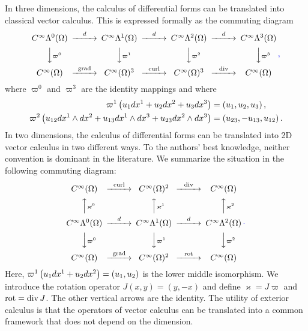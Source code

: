 \documentclass[10pt,a4paper]{article}
\newcommand\cye[1]{%
\protect\leavevmode
\begingroup
    \color{blue}%
    #1%
\endgroup
}
\begin{document}
\begin{remark}
    In three dimensions, 
    the calculus of differential forms can be translated into classical vector calculus. 
    This is expressed formally as the commuting diagram 
    \begin{gather*}
    \begin{CD}
        C^\infty\Alt^0(\Omega) @>{\cartan}>> C^\infty\Alt^1(\Omega) @>{\cartan}>> C^\infty\Alt^2(\Omega) @>{\cartan}>> C^\infty\Alt^3(\Omega) 
        \\
        @VV{\varpi^{0}}V 
        @VV{\varpi^{1}}V 
        @VV{\varpi^{2}}V 
        @VV{\varpi^{3}}V 
        \\
        C^\infty(\Omega) @>{\grad}>> C^\infty(\Omega)^{3} @>{\curl}>> C^\infty(\Omega)^{3} @>{\divergence}>> C^\infty(\Omega)
    \end{CD}
    \cye{\, ,}
    \end{gather*}
    where $\varpi^{0}$ and $\varpi^{3}$ are the identity mappings and where 
    \begin{align*}
     \varpi^{1}\left( u_1 dx^{1} + u_2 dx^{2} + u_3 dx^{3} \right) 
     &= 
     \left( u_1, u_2, u_3 \right), 
     \\
     \varpi^{2}\left( u_{12} dx^{1} \wedge dx^{2} + u_{13} dx^{1} \wedge dx^{3} + u_{23} dx^{2} \wedge dx^{3} \right) 
     &= 
     \left( u_{23}, - u_{13}, u_{12} \right).   
    \end{align*}
    In two dimensions, 
    the calculus of differential forms can be translated into 2D vector calculus in two different ways. 
    To the authors' best knowledge, neither convention is dominant in the literature.
    We summarize the situation in the following commuting diagram: 
    \begin{gather*} 
    \begin{CD}
        C^\infty(\Omega) @>{\curl}>> C^\infty(\Omega)^{2} @>{\divergence}>> C^\infty(\Omega)
        \\
        @AA{\varkappa^{0}}A 
        @AA{\varkappa^{1}}A 
        @AA{\varkappa^{2}}A 
        \\
        C^\infty\Alt^0(\Omega) @>{\cartan}>> C^\infty\Alt^1(\Omega) @>{\cartan}>> C^\infty\Alt^2(\Omega) 
        \\
        @VV{\varpi^{0}}V 
        @VV{\varpi^{1}}V 
        @VV{\varpi^{2}}V 
        \\
        C^\infty(\Omega) @>{\grad}>> C^\infty(\Omega)^{2} @>{\rot}>> C^\infty(\Omega)
    \end{CD}
    \cye{\,.}
    \end{gather*}
    Here, $\varpi^{1}\left( u_1 dx^{1} + u_2 dx^{2} \right) = \left( u_1, u_2 \right)$ is the lower middle isomorphism. We introduce the rotation operator $J(x,y) = (y,-x)$ and define $\varkappa = J \varpi$ and $\operatorname{rot} = \operatorname{div} J$.
    The other vertical arrows are the identity. 
    The utility of exterior calculus is that the operators of vector calculus can be translated into a common framework that does not depend on the dimension.
\end{remark}
\end{document}
